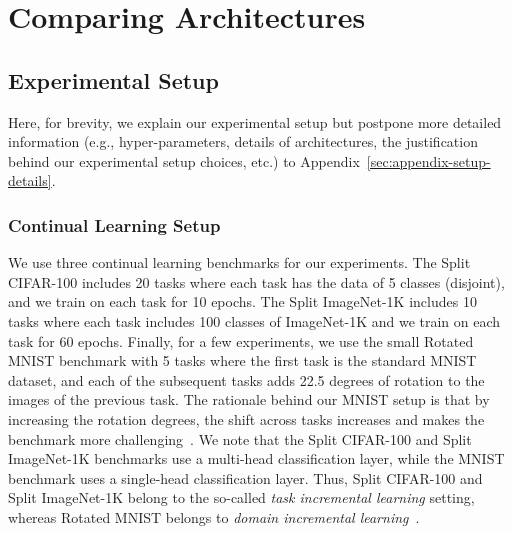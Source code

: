 \negspace{-1mm}
\section{Comparing Architectures}\label{sec:architectures}
\subsection{Experimental Setup}
Here, for brevity, we explain our experimental setup but postpone more detailed information (e.g., hyper-parameters, details of architectures, the justification behind our experimental setup choices, etc.) to Appendix~\ref{sec:appendix-setup-details}.



\subsubsection{Continual Learning Setup}
We use three continual learning benchmarks for our experiments. The Split CIFAR-100 includes 20 tasks where each task has the data of 5 classes (disjoint), and we train on each task for 10 epochs. The Split ImageNet-1K includes 10 tasks where each task includes 100 classes of ImageNet-1K and we train on each task for 60 epochs. Finally, for a few experiments, we use the small Rotated MNIST benchmark with 5 tasks where the first task is the standard MNIST dataset, and each of the subsequent tasks adds 22.5 degrees of rotation to the images of the previous task. The rationale behind our MNIST setup is that by increasing the rotation degrees, the shift across tasks increases and makes the benchmark more challenging~\citep{mirzadeh2021linear}. We note that the Split CIFAR-100 and Split ImageNet-1K benchmarks use a multi-head classification layer, while the MNIST benchmark uses a single-head classification layer. Thus, Split CIFAR-100 and Split ImageNet-1K belong to the so-called \emph{task incremental learning} setting, whereas Rotated MNIST belongs to \emph{domain incremental learning}~\citep{hsu2018re}.


